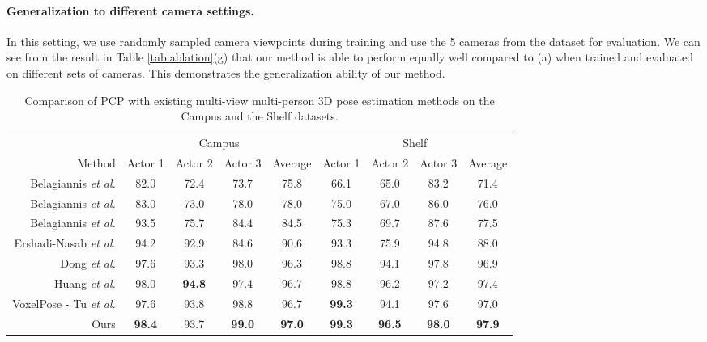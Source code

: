 \documentclass[final]{cvpr}
\begin{document}
\vspace{-3mm} \paragraph{Generalization to different camera settings.}
In this setting, we use randomly sampled camera viewpoints during training and use the 5 cameras from the dataset for evaluation.
We can see from the result in Table \ref{tab:ablation}(g) that our method is able to perform equally well compared to (a) when trained and evaluated on different sets of cameras.
This demonstrates the generalization ability of our method.

\renewcommand{\arraystretch}{1}
\setlength{\tabcolsep}{8pt}
\begin{table*}[t]
    \centering
    \begin{tabular}{r|cccc|cccc}
        \toprule
        & \multicolumn{4}{c|}{Campus} & \multicolumn{4}{c}{Shelf} \\
        Method & Actor 1 & Actor 2 & Actor 3 & Average & Actor 1 & Actor 2 & Actor 3 & Average\\
        \midrule
        \midrule
        Belagiannis \textit{et al.} \cite{belagiannis20143d} & 82.0 & 72.4 & 73.7 & 75.8 & 66.1 & 65.0 & 83.2 & 71.4 \\
        Belagiannis \textit{et al.} \cite{belagiannis2014multiple} & 83.0 & 73.0 & 78.0 & 78.0 & 75.0 & 67.0 & 86.0 & 76.0 \\
        Belagiannis \textit{et al.} \cite{belagiannis20153d} & 93.5 & 75.7 & 84.4 & 84.5 & 75.3 & 69.7 & 87.6 & 77.5 \\
        Ershadi-Nasab \textit{et al.} \cite{ershadi2018multiple} & 94.2 & 92.9 & 84.6 & 90.6 & 93.3 & 75.9 & 94.8 & 88.0 \\
        Dong \textit{et al.} \cite{dong2019fast} & 97.6 & 93.3 & 98.0 & 96.3 & 98.8 & 94.1 & 97.8 & 96.9 \\
        Huang \textit{et al.} \cite{huang2020end} & 98.0 & \textbf{94.8} & 97.4 & 96.7 & 98.8 & 96.2 & 97.2 & 97.4 \\
        VoxelPose - Tu \textit{et al.} \cite{tu2020voxelpose} & 97.6 & 93.8 & 98.8 & 96.7 & \textbf{99.3} & 94.1 & 97.6 & 97.0 \\
        Ours & \textbf{98.4} & 93.7 & \textbf{99.0} & \textbf{97.0} & \textbf{99.3} & \textbf{96.5} & \textbf{98.0} & \textbf{97.9} \\
        \bottomrule
    \end{tabular}
    \vspace{+1mm}
    \caption{Comparison of PCP with existing multi-view multi-person 3D pose estimation methods on the Campus and the Shelf datasets.}
    \vspace{-4mm}
    \label{tab:benchmark}
\end{table*}
\end{document}
